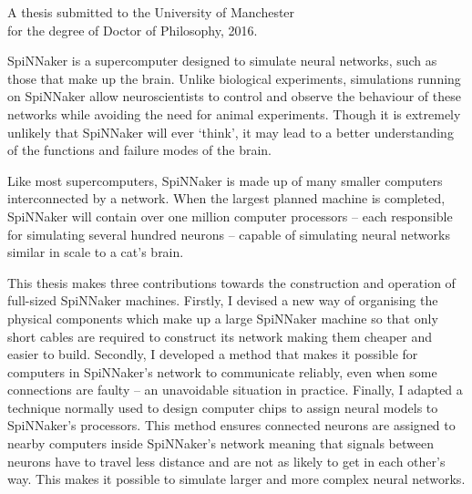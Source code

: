 {
	
	
	
	\vfill
	
	\begin{center}
		\textsc{\large\thesistitle}
		
		\vspace{0.5em}
		
		\thesisauthor
		
		\vspace{0.5em}
		
		A thesis submitted to the University of Manchester\\
		for the degree of Doctor of Philosophy, 2016.
	\end{center}
	
	\vfill
	
	
	SpiNNaker is a supercomputer designed to simulate neural networks, such as
	those that make up the brain. Unlike biological experiments, simulations
	running on SpiNNaker allow neuroscientists to control and observe the
	behaviour of these networks while avoiding the need for animal experiments.
	Though it is extremely unlikely that SpiNNaker will ever `think', it may lead
	to a better understanding of the functions and failure modes of the brain.
	
	Like most supercomputers, SpiNNaker is made up of many smaller computers
	interconnected by a network. When the largest planned machine is completed,
	SpiNNaker will contain over one million computer processors -- each
	responsible for simulating several hundred neurons -- capable of simulating
	neural networks similar in scale to a cat's brain.
	
	This thesis makes three contributions towards the construction and operation
	of full-sized SpiNNaker machines. Firstly, I devised a new way of organising
	the physical components which make up a large SpiNNaker machine so that only
	short cables are required to construct its network making them cheaper and
	easier to build. Secondly, I developed a method that makes it possible for
	computers in SpiNNaker's network to communicate reliably, even when some
	connections are faulty -- an unavoidable situation in practice.  Finally, I
	adapted a technique normally used to design computer chips to assign neural
	models to SpiNNaker's processors. This method ensures connected neurons are
	assigned to nearby computers inside SpiNNaker's network meaning that signals
	between neurons have to travel less distance and are not as likely to get in
	each other's way. This makes it possible to simulate larger and more complex
	neural networks.
	
	\par%
}
